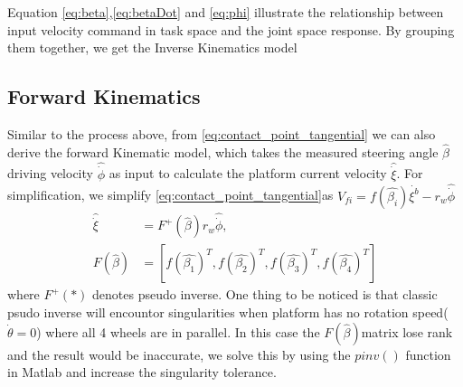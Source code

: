 Equation \cref{eq:beta},\cref{eq:betaDot} and \cref{eq:phi} illustrate the relationship between input velocity command in task space and the joint space response. By grouping them together, we get the Inverse Kinematics model


\subsection{Forward Kinematics}
\label{sec:forwardKinematics}

Similar to the process above, from \cref{eq:contact_point_tangential} we can also derive the forward Kinematic model, which takes the measured steering angle $\hat{\beta}$ driving velocity $\hat{\dot{\phi}}$ as input to 
calculate the platform current velocity $\hat{\dot{\xi}}$. For simplification, we simplify \cref{eq:contact_point_tangential}as $V_{fi}=f(\hat{\beta_i})\dot{\xi^b} -r_w\hat{\dot{\phi}}$
\begin{equation}
	\label{eq:forwardKinematics}
	\begin{split}
	\hat{\dot{\xi}} &= F^+(\hat{\beta})r_w\hat{\dot{\phi}},\\
	F(\hat{\beta}) &= [f(\hat{\beta_1})^T, f(\hat{\beta_2})^T, f(\hat{\beta_3})^T, f(\hat{\beta_4})^T]
	\end{split}
	\end{equation}
where $F^+(*)$ denotes pseudo inverse. One thing to be noticed is that classic psudo inverse will encountor singularities when platform has no rotation speed($\dot{\theta}=0$) where all 4 wheels are in parallel. In this case the $F(\hat{\beta})$matrix lose rank and the result would be inaccurate, we solve this by using the $pinv()$ function in Matlab and increase the singularity tolerance.


